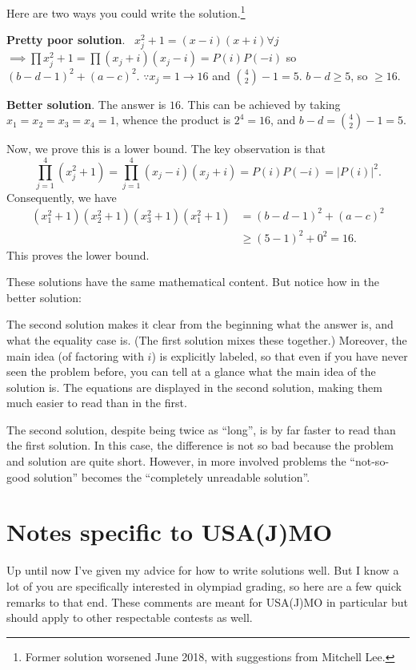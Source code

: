 Here are two ways you could write the solution.\footnote{Former
solution worsened June 2018, with suggestions from Mitchell Lee.}
\begin{mdframed}
	\textbf{Pretty poor solution}. \; \,
	$x_j^2+1 = (x-i)(x+i) \forall j$
	$\implies \prod x_j^2+1 = \prod (x_j+i)(x_j-i) = P(i)P(-i)$
	so $(b-d-1)^2 + (a-c)^2$.
	$\because x_j = 1 \rightarrow 16$ and $\binom42-1 = 5$.
	$b-d \ge 5$, so $\ge 16$.
\end{mdframed}

\begin{mdframed}
	\textbf{Better solution}.
	The answer is $\boxed{16}$.
	This can be achieved by taking $x_1 = x_2 = x_3 = x_4 = 1$,
	whence the product is $2^4 = 16$, and $b-d = \binom42-1 = 5$.

	Now, we prove this is a lower bound.
	The key observation is that
	\[ \prod_{j=1}^4 \left( x_j^2 + 1 \right)
		= \prod_{j=1}^4 (x_j - i)(x_j + i)
		= P(i)P(-i) = |P(i)|^2. \]
	Consequently, we have
	\begin{align*}
		\left( x_1^2 + 1 \right)
		\left( x_2^2 + 1 \right)
		\left( x_3^2 + 1 \right)
		\left( x_1^2 + 1 \right)
		&= (b-d-1)^2 + (a-c)^2 \\
		&\ge (5-1)^2 + 0^2 = 16.
	\end{align*}
	This proves the lower bound.
\end{mdframed}

These solutions have the same mathematical content.
But notice how in the better solution:
\begin{itemize}
	\ii The second solution makes it clear
	from the beginning what the answer is, and what the equality case is.
	(The first solution mixes these together.)
	\ii Moreover, the main idea (of factoring with $i$) is explicitly labeled,
	so that even if you have never seen the problem before,
	you can tell at a glance what the main idea of the solution is.
	\ii The equations are displayed in the second solution,
	making them much easier to read than in the first.
\end{itemize}
The second solution, despite being twice as ``long'',
is by far faster to read than the first solution.
In this case, the difference is not so bad because the
problem and solution are quite short.
However, in more involved problems the ``not-so-good solution''
becomes the ``completely unreadable solution''.

\newpage

\appendix
\section{Notes specific to USA(J)MO}
Up until now I've given my advice for how to write solutions well.
But I know a lot of you are specifically interested in olympiad grading,
so here are a few quick remarks to that end.
These comments are meant for USA(J)MO in particular
but should apply to other respectable contests as well.

